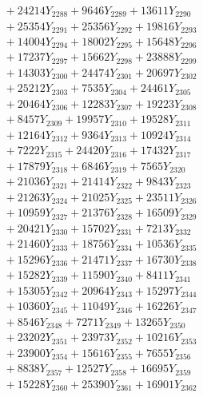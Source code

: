 \documentclass[a4paper,10pt]{article}
\begin{document}
{\begin{align}
&\;  + 24214 Y_{2288} + 9646 Y_{2289} + 13611 Y_{2290} \\[0.3ex]
&\;  + 25354 Y_{2291} + 25356 Y_{2292} + 19816 Y_{2293} \\[0.3ex]
&\;  + 14004 Y_{2294} + 18002 Y_{2295} + 15648 Y_{2296} \\[0.3ex]
&\;  + 17237 Y_{2297} + 15662 Y_{2298} + 23888 Y_{2299} \\[0.3ex]
&\;  + 14303 Y_{2300} + 24474 Y_{2301} + 20697 Y_{2302} \\[0.3ex]
&\;  + 25212 Y_{2303} + 7535 Y_{2304} + 24461 Y_{2305} \\[0.3ex]
&\;  + 20464 Y_{2306} + 12283 Y_{2307} + 19223 Y_{2308} \\[0.5ex]\allowbreak
&\;  + 8457 Y_{2309} + 19957 Y_{2310} + 19528 Y_{2311} \\[0.3ex]
&\;  + 12164 Y_{2312} + 9364 Y_{2313} + 10924 Y_{2314} \\[0.3ex]
&\;  + 7222 Y_{2315} + 24420 Y_{2316} + 17432 Y_{2317} \\[0.3ex]
&\;  + 17879 Y_{2318} + 6846 Y_{2319} + 7565 Y_{2320} \\[0.3ex]
&\;  + 21036 Y_{2321} + 21414 Y_{2322} + 9843 Y_{2323} \\[0.3ex]
&\;  + 21263 Y_{2324} + 21025 Y_{2325} + 23511 Y_{2326} \\[0.3ex]
&\;  + 10959 Y_{2327} + 21376 Y_{2328} + 16509 Y_{2329} \\[0.3ex]
&\;  + 20421 Y_{2330} + 15702 Y_{2331} + 7213 Y_{2332} \\[0.3ex]
&\;  + 21460 Y_{2333} + 18756 Y_{2334} + 10536 Y_{2335} \\[0.3ex]
&\;  + 15296 Y_{2336} + 21471 Y_{2337} + 16730 Y_{2338} \\[0.5ex]\allowbreak
&\;  + 15282 Y_{2339} + 11590 Y_{2340} + 8411 Y_{2341} \\[0.3ex]
&\;  + 15305 Y_{2342} + 20964 Y_{2343} + 15297 Y_{2344} \\[0.3ex]
&\;  + 10360 Y_{2345} + 11049 Y_{2346} + 16226 Y_{2347} \\[0.3ex]
&\;  + 8546 Y_{2348} + 7271 Y_{2349} + 13265 Y_{2350} \\[0.3ex]
&\;  + 23202 Y_{2351} + 23973 Y_{2352} + 10216 Y_{2353} \\[0.3ex]
&\;  + 23900 Y_{2354} + 15616 Y_{2355} + 7655 Y_{2356} \\[0.3ex]
&\;  + 8838 Y_{2357} + 12527 Y_{2358} + 16695 Y_{2359} \\[0.3ex]
&\;  + 15228 Y_{2360} + 25390 Y_{2361} + 16901 Y_{2362} \\[0.3ex]

\end{align}}
\end{document}
